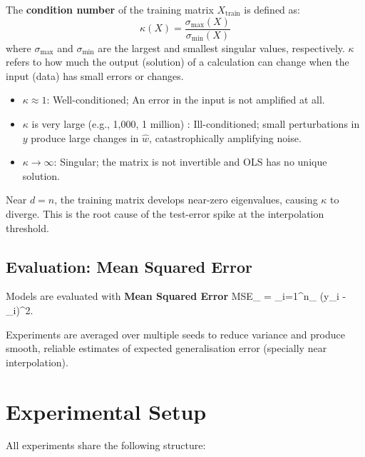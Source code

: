 \documentclass[12pt, a4paper]{article}
\begin{document}
The \textbf{condition number} of the training matrix $X_{\mathrm{train}}$ is defined as:
\begin{equation}
  \kappa(X) = \frac{\sigma_{\max}(X)}{\sigma_{\min}(X)}
  \label{eq:cond}
\end{equation}
where $\sigma_{\max}$ and $\sigma_{\min}$ are the largest and smallest singular values, respectively.
$\kappa$ refers to how much the output (solution) of a calculation can change when the input (data) has small errors or changes.

\begin{itemize}
  \item $\kappa \approx 1$: Well-conditioned; An error in the input is not amplified at all.
  \item $\kappa$ is very large (e.g., 1,000, 1 million) : Ill-conditioned; small perturbations in $y$ produce large changes in $\hat{w}$, catastrophically amplifying noise.
  \item $\kappa \to \infty$: Singular; the matrix is not invertible and OLS has no unique solution.
\end{itemize}

Near $d = n$, the training matrix develops near-zero eigenvalues, causing $\kappa$ to diverge. This is the root cause of the test-error spike at the interpolation threshold.

\subsection{Evaluation: Mean Squared Error}

Models are evaluated with \textbf{Mean Squared Error} {MSE}_{}  =   \sum_{i=1}^{n_{}}  (y_i - _i)^2.

Experiments are averaged over multiple seeds to reduce variance and produce smooth, reliable estimates of expected generalisation error (specially near interpolation).

\section{Experimental Setup}

All experiments share the following structure:
\end{document}
